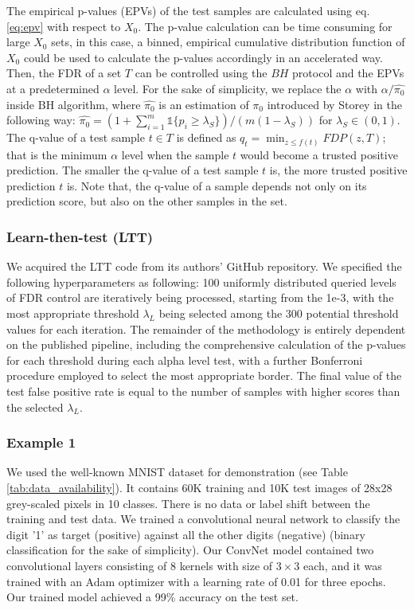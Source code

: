 \documentclass[10pt,letterpaper]{article}
\newcommand{\mathone}{\mathds{1}}
\begin{document}
The empirical  p-values (EPVs) of the test samples are calculated using eq. \ref{eq:epv} with respect to $X_0$.
The p-value calculation can be time consuming for large $X_0$ sets, in this case, a binned, empirical cumulative distribution function of $X_0$ could be used to calculate the p-values accordingly in an accelerated way.
Then, the FDR of a set $T$ can be controlled using the $BH$ protocol and the EPVs at a predetermined $\alpha$ level.
For the sake of simplicity, we replace the $\alpha$ with $\alpha/\hat{\pi_0}$ inside BH algorithm, where $\hat{\pi_0}$ is an estimation of $\pi_0$ introduced by Storey \cite{storey2004strong} in the following way: $\hat{\pi_0} = (1+\sum_{i=1}^m \mathone\{p_i\ge\lambda_S\} )/(m(1-\lambda_S))$ for $\lambda_S\in (0,1)$.
The q-value of a test sample $t\in T$ is defined as $q_t=\min_{z\le f(t)}FDP( z, T )$; that is the minimum $\alpha$ level when the sample $t$ would become a trusted positive prediction. 
The smaller the q-value of a test sample $t$ is, the more trusted positive prediction $t$ is.
Note that, the q-value of a sample depends not only on its prediction score, but also on the other samples in the set. 

\subsubsection*{Learn-then-test (LTT)} We acquired the LTT code from its authors' GitHub repository.
We  specified the following hyperparameters as following: 100 uniformly distributed queried levels of FDR control are iteratively being processed, starting from the 1e-3, with the most appropriate threshold $\lambda_L$ being selected among the 300 potential threshold values for each iteration.
The remainder of the methodology is entirely dependent on the published pipeline, including the comprehensive calculation of the p-values for each threshold during each alpha level test, with a further Bonferroni procedure employed to select the most appropriate border.
The final value of the test false positive rate is equal to the number of samples with higher scores than the selected $\lambda_L$. 

\subsubsection*{Example 	 1} \label{ex:vanilla} We used the well-known MNIST dataset for demonstration \cite{lecun1998gradient} (see Table \ref{tab:data_availability}).
It contains 60K training and 10K test images of 28x28 grey-scaled pixels in 10 classes.
There is no data or label shift between the training and test data.
We trained a convolutional neural network to classify the digit '1' as target (positive) against all the other digits (negative) (binary classification for the sake of simplicity).
Our ConvNet model contained two convolutional layers consisting of 8 kernels with size of $3\times3$ each, and it was trained with an Adam optimizer with a learning rate of 0.01 for three epochs.
Our trained model achieved a 99\% accuracy on the test set. 
\end{document}
